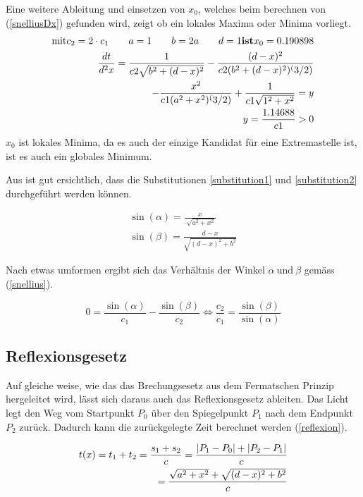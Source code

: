 Eine weitere Ableitung und einsetzen von $x_0$, welches beim berechnen von (\eqref{snelliusDx}) gefunden wird, zeigt ob ein lokales Maxima oder Minima vorliegt.
\begin{align}
\text{mit} c_2=2 \cdot c_1 \qquad a=1 \qquad b=2a \qquad d=1 \textbf{ist} x_0 = 0.190898 \notag \\
\frac{dt}{d^2x}=\frac{1}{c2 \sqrt{b^2 + (d - x)^2}} - \frac{(d - x)^2 }{c2 (b^2 + (d - x)^2)^(3/2)} \notag \\
- \frac{x^2}{c1 (a^2 + x^2)^(3/2)} + \frac{1}{c1 \sqrt{1^2 + x^2}} = y  \notag \\
y =\frac{1.14688}{c1} > 0
\end{align}
$x_0$ ist lokales Minima, da es auch der einzige Kandidat für eine Extremastelle ist, ist es auch ein globales Minimum.

Aus  ist gut ersichtlich, dass die Substitutionen \ref{substitution1} und \ref{substitution2} durchgeführt werden können.

\begin{align}
	\sin(\alpha) = \frac{x}{\cdot \sqrt{a^2 + x^2}}  \label{substitution1}\\
	\sin(\beta) = \frac{d-x}{\sqrt{(d -x)^2 + b^2}} \label{substitution2}
\end{align}

Nach etwas umformen ergibt sich das Verhältnis der Winkel $\alpha \ \text{und} \ \beta$ gemäss (\eqref{snellius}).

\begin{equation}
	0 = \frac{\sin(\alpha)}{c_1} - \frac{\sin(\beta)}{c_2} \Leftrightarrow\frac{c_2}{c_1} = \frac{\sin(\beta)}{\sin(\alpha)}
	\label{snellius}
\end{equation}


\subsection{Reflexionsgesetz}
\cite{Wikipedia} Auf gleiche weise, wie das das Brechungsesetz aus dem Fermatschen Prinzip hergeleitet wird, 
lässt sich daraus auch das Reflexionsgesetz ableiten.
Das Licht legt den Weg vom Startpunkt $P_0$ über den Spiegelpunkt $P_1$ 
nach dem Endpunkt $P_2$ zurück. Dadurch kann die zurückgelegte Zeit berechnet werden (\eqref{reflexion}).


\begin{align}
t(x) = t_1 + t_2 = \frac{s_1 + s_2}{c} = \frac{|P_1 - P_0| + |P_2 - P_1|}{c} \notag \\
= \frac{\sqrt{a^2 + x^2} + \sqrt{(d-x)^2 + b^2}}{c} \label{reflexion}
\end{align}


